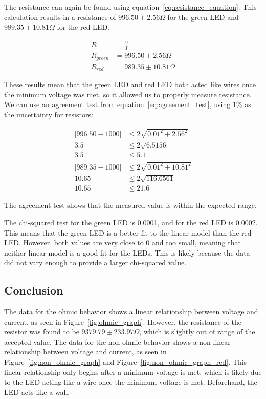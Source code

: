 \documentclass[11pt]{article}
\begin{document}
    The resistance can again be found using equation~\ref{eq:resistance_equation}.
    This calculation results in a resistance of $996.50 \pm 2.56 \Omega$ for the green LED and $989.35 \pm 10.81 \Omega$ for the red LED\@.
    \begin{e}
        \begin{align*}
            R &= \frac{V}{I} \\
            R_{green} &= 996.50 \pm2.56 \Omega \\
            R_{red} &= 989.35 \pm10.81 \Omega
        \end{align*}
    \end{e}

    These results mean that the green LED and red LED both acted like wires once the minimum voltage was met, so it
    allowed us to properly measure resistance.
    We can use an agreement test from equation~\ref{eq:agreement_test}, using 1\% as the uncertainty for resistors:
    \begin{e}
        \begin{align*}
            |996.50 - 1000| &\le 2 \sqrt{0.01^2 + 2.56^2} \\
            3.5 &\le 2 \sqrt{6.5156} \\
            3.5 &\le 5.1 \\
            |989.35 - 1000| &\le 2 \sqrt{0.01^2 + 10.81^2} \\
            10.65 &\le 2 \sqrt{116.6561} \\
            10.65 &\le 21.6
        \end{align*}
    \end{e}
    The agreement test shows that the measured value is within the expected range.

    The chi-squared test for the green LED is 0.0001, and for the red LED is 0.0002.
    This means that the green LED is a better fit to the linear model than the red LED\@.
    However, both values are very close to 0 and too small, meaning that neither linear model is a good fit for the LEDs.
    This is likely because the data did not vary enough to provide a larger chi-squared value.

    
    \subsection{Conclusion}\label{subsec:ohmic_conclusion}

    The data for the ohmic behavior shows a linear relationship between voltage and current, as seen in Figure~\ref{fig:ohmic_graph}.
    However, the resistance of the resistor was found to be $9379.79 \pm 233.97 \Omega$, which is slightly out of range of the accepted value.
    The data for the non-ohmic behavior shows a non-linear relationship between voltage and current, as seen in Figure~\ref{fig:non_ohmic_graph} and Figure~\ref{fig:non_ohmic_graph_red}.
    This linear relationship only begins after a minimum voltage is met, which is likely due to the LED acting like a wire once the minimum voltage is met.
    Beforehand, the LED acts like a wall.
\end{document}

